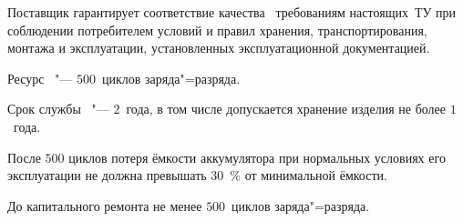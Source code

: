 \fakesubsection{} 
Поставщик гарантирует соответствие качества \dut \ требованиям настоящих~ТУ при соблюдении потребителем условий и правил хранения, транспортирования, монтажа и эксплуатации, установленных эксплуатационной документацией.

\fakesubsection{}
Ресурс \dut \ "--- $500$~циклов заряда"=разряда.

Срок службы \dut \ "--- $2$~года, в том числе допускается хранение изделия не более $1$~года.


После $500$ циклов потеря ёмкости аккумулятора при нормальных условиях его эксплуатации не должна превышать $30$~\% от минимальной ёмкости.

\fakesubsection{}
До капитального ремонта не менее $500$~циклов заряда"=разряда.